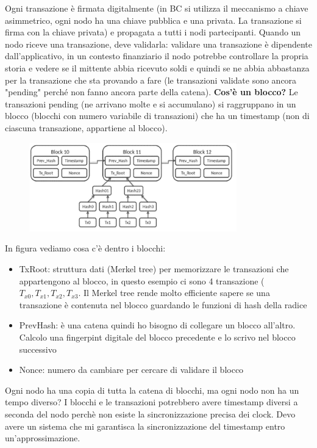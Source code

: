 \documentclass[12pt,italian]{report}
\begin{document}
Ogni transazione è firmata digitalmente (in BC si utilizza il meccanismo a chiave asimmetrico, ogni nodo ha una chiave pubblica e una privata. La transazione si firma con la chiave privata) e propagata a tutti i nodi partecipanti. Quando un nodo riceve una transazione, deve validarla: validare una transazione è dipendente dall'applicativo, in un contesto finanziario il nodo potrebbe controllare la propria storia e vedere se il mittente abbia ricevuto soldi e quindi se ne abbia abbastanza per la transazione che sta provando a fare (le transazioni validate sono ancora "pending" perché non fanno ancora parte della catena). 
\bigbreak
\noindent \textbf{Cos'è un blocco?}
Le transazioni pending (ne arrivano molte e si accumulano) si raggruppano in un blocco (blocchi con numero variabile di transazioni) che ha un timestamp (non di ciascuna transazione, appartiene al blocco). 
\begin{figure}[h]
\centering
\includegraphics[width=90mm]{img/block.png}
\end{figure}
In figura vediamo cosa c'è dentro i blocchi:
\begin{itemize}
    \item TxRoot: struttura dati (Merkel tree) per memorizzare le transazioni che appartengono al blocco, in questo esempio ci sono 4 transazione ($T_{x0}, T_{x1}, T_{x2}, T_{x3}$. Il Merkel tree rende molto efficiente sapere se una transazione è contenuta nel blocco guardando le funzioni di hash della radice
    \item PrevHash: è una catena quindi ho bisogno di collegare un blocco all'altro. Calcolo una fingerpint digitale del blocco precedente e lo scrivo nel blocco successivo
    \item Nonce: numero da cambiare per cercare di validare il blocco
\end{itemize}
Ogni nodo ha una copia di tutta la catena di blocchi, ma ogni nodo non ha un tempo diverso? I blocchi e le transazioni potrebbero avere timestamp diversi a seconda del nodo perchè non esiste la sincronizzazione precisa dei clock. Devo avere un sistema che mi garantisca la sincronizzazione del timestamp entro un'approssimazione.
\end{document}
